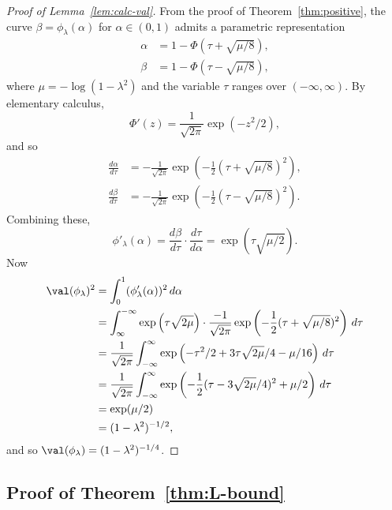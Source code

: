\documentclass[11pt]{article}
\begin{document}
\begin{proof}[Proof of Lemma~\ref{lem:calc-val}]

From the proof of Theorem~\ref{thm:positive}, the curve $\beta = \phi_\lambda(\alpha)$ for $\alpha \in (0,1)$ admits a parametric representation
\begin{align}
\label{eq:parametric-a}
\alpha &= 1-\Phi(\tau+\sqrt{\mu/8}), \\
\label{eq:parametric-b}
\beta &= 1-\Phi(\tau-\sqrt{\mu/8}),
\end{align}
where $\mu = -\log(1-\lambda^2)$ and the variable $\tau$ ranges over $(-\infty,\infty)$. By elementary calculus,
\[ \Phi'(z) = \frac{1}{\sqrt{2\pi}} \exp(-z^2/2), \]
and so
\begin{align*}
\frac{d\alpha}{d\tau} &= -\frac{1}{\sqrt{2\pi}} \exp\left(-\frac{1}{2}(\tau + \sqrt{\mu/8})^2\right), \\
\frac{d\beta}{d\tau} &= -\frac{1}{\sqrt{2\pi}} \exp\left(-\frac{1}{2}(\tau - \sqrt{\mu/8})^2\right).
\end{align*}
Combining these,
\begin{equation}\label{eq:phi-prime}
\phi'_\lambda(\alpha) = \frac{d\beta}{d\tau} \cdot \frac{d\tau}{d\alpha} = \exp\left(\tau\sqrt{\mu/2}\right).
\end{equation}
Now
\begin{align*}
\val(\phi_\lambda)^2 &= \int_0^1 (\phi_\lambda'(\alpha))^2 \,d\alpha \\
&= \int_{\infty}^{-\infty} \exp\left(\tau \sqrt{2\mu}\right) \cdot \frac{-1}{\sqrt{2\pi}} \exp\left(-\frac{1}{2}(\tau + \sqrt{\mu/8})^2\right) \,d\tau \\
&= \frac{1}{\sqrt{2\pi}} \int_{-\infty}^\infty \exp\left(-\tau^2/2 + 3\tau\sqrt{2\mu}/4 - \mu/16\right) \,d\tau \\
&= \frac{1}{\sqrt{2\pi}} \int_{-\infty}^\infty \exp\left(-\frac{1}{2}(\tau - 3\sqrt{2\mu}/4)^2 + \mu/2\right) \,d\tau \\
&= \exp(\mu/2) \\
&= (1-\lambda^2)^{-1/2},
\end{align*}
and so $\val(\phi_\lambda) = (1-\lambda^2)^{-1/4}$.
\end{proof}



\subsection{Proof of Theorem~\ref{thm:L-bound}}
\end{document}
